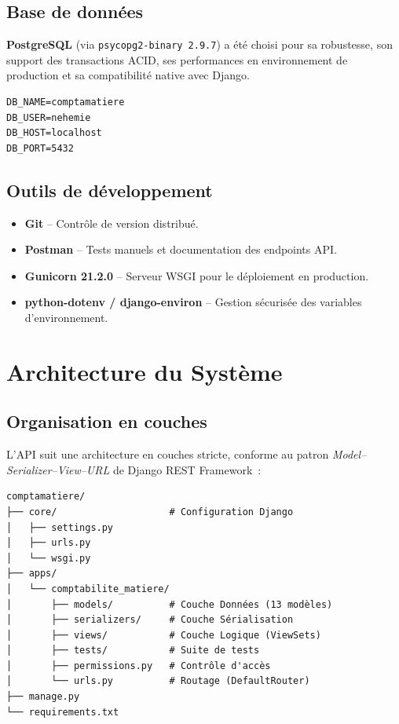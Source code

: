 \documentclass[12pt,a4paper]{report}
\begin{document}
\section{Base de données}
\textbf{PostgreSQL} (via \texttt{psycopg2-binary 2.9.7}) a été choisi pour sa robustesse, son support des transactions ACID, ses performances en environnement de production et sa compatibilité native avec Django.

\begin{tcolorbox}[title=Configuration BD]
\begin{verbatim}
DB_NAME=comptamatiere
DB_USER=nehemie
DB_HOST=localhost
DB_PORT=5432
\end{verbatim}
\end{tcolorbox}

\section{Outils de développement}
\begin{itemize}[leftmargin=*]
    \item \textbf{Git} -- Contrôle de version distribué.
    \item \textbf{Postman} -- Tests manuels et documentation des endpoints API.
    \item \textbf{Gunicorn 21.2.0} -- Serveur WSGI pour le déploiement en production.
    \item \textbf{python-dotenv / django-environ} -- Gestion sécurisée des variables d'environnement.
\end{itemize}

\chapter{Architecture du Système}

\section{Organisation en couches}
L'API suit une architecture en couches stricte, conforme au patron \textit{Model--Serializer--View--URL} de Django REST Framework~:

\begin{tcolorbox}[title=Structure du projet]
\begin{verbatim}
comptamatiere/
├── core/                    # Configuration Django
│   ├── settings.py
│   ├── urls.py
│   └── wsgi.py
├── apps/
│   └── comptabilite_matiere/
│       ├── models/          # Couche Données (13 modèles)
│       ├── serializers/     # Couche Sérialisation
│       ├── views/           # Couche Logique (ViewSets)
│       ├── tests/           # Suite de tests
│       ├── permissions.py   # Contrôle d'accès
│       └── urls.py          # Routage (DefaultRouter)
├── manage.py
└── requirements.txt
\end{verbatim}
\end{tcolorbox}
\end{document}
